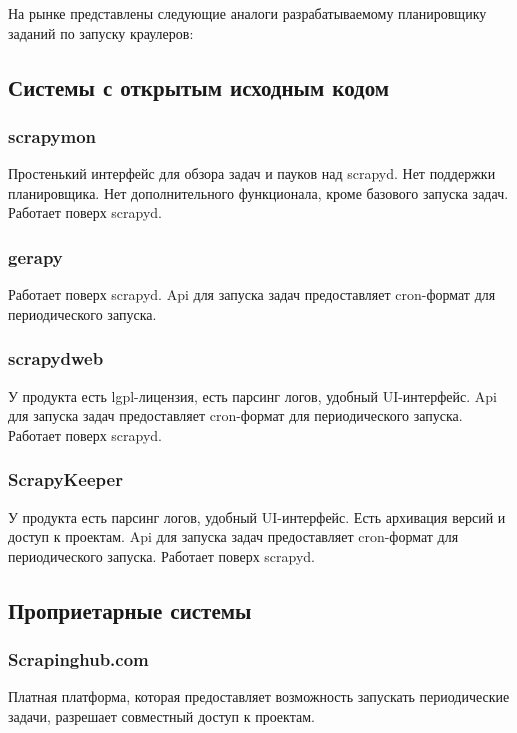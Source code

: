 \documentclass[a4paper,12pt]{article}
\begin{document}
На рынке представлены следующие аналоги разрабатываемому планировщику заданий по запуску краулеров:
\subsection*{Системы с открытым исходным кодом}
\subsubsection*{scrapymon}

Простенький интерфейс для обзора задач и пауков над scrapyd. Нет поддержки планировщика. Нет дополнительного функционала, кроме базового запуска задач. Работает поверх scrapyd.

\subsubsection*{gerapy}

Работает поверх scrapyd. Api для запуска задач предоставляет cron-формат для периодического запуска. 

\subsubsection*{scrapydweb}

У продукта есть lgpl-лицензия, есть парсинг логов, удобный UI-интерфейс. Api для запуска задач предоставляет cron-формат для периодического запуска. Работает поверх scrapyd. 

\subsubsection*{ScrapyKeeper}

У продукта есть парсинг логов, удобный UI-интерфейс. Есть архивация версий и доступ к проектам. Api для запуска задач предоставляет cron-формат для периодического запуска. Работает поверх scrapyd. 

\subsection*{Проприетарные системы}

\subsubsection*{Scrapinghub.com}

Платная платформа, которая предоставляет возможность запускать периодические задачи, разрешает совместный доступ к проектам.
\end{document}
